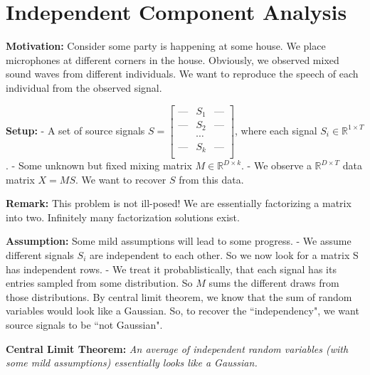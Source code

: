 \section{Independent Component Analysis}
\textbf{Motivation: } \newline Consider some party is happening at some house. We place microphones at different corners in the house. Obviously, we observed mixed sound waves from different individuals. We want to reproduce the speech of each individual from the observed signal.

\textbf{Setup: }  
\newline - A set of source signals $ S = 
\begin{bmatrix}
    \text{---} & S_1 & \text{---}\\
    \text{---} & S_2 & \text{---}  \\
     & \cdots &   \\
    \text{---} & S_k & \text{---} \\
\end{bmatrix} $, where each signal $ S_i \in \mathbb{R}^{1\times T}$. 
\newline - Some unknown but fixed mixing matrix $M \in \mathbb{R}^{D\times k} $. 
\newline - We observe a $\mathbb{R}^{D\times T}$ data matrix $X = MS$. We want to recover $S$ from this data.

\textbf{Remark: } \newline
This problem is not ill-posed! We are essentially factorizing a matrix into two. Infinitely many factorization solutions exist.

\textbf{Assumption: } \newline Some mild assumptions will lead to some progress. \newline 
- We assume different signals $S_i$ are independent to each other. So we now look for a matrix S has independent rows. \newline
- We treat it probablistically, that each signal has its entries sampled from some distribution. So $M$ sums the different draws from those distributions. By central limit theorem, we know that the sum of random variables would look like a Gaussian. So, to recover the ``independency", we want source signals to be ``not Gaussian".

\textbf{Central Limit Theorem:}\textsl{ An average of independent random variables (with some mild assumptions) essentially looks like a Gaussian.}

